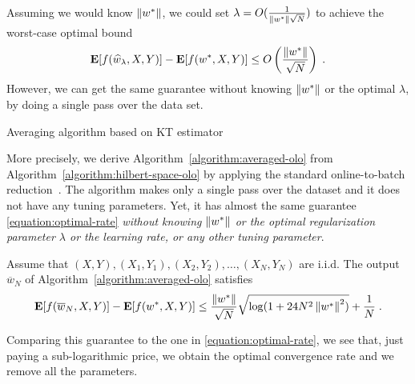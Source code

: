 Assuming we would know $\left\|{w^*}\right\|$, we could set $\lambda =
O(\tfrac{1}{\left\|{w^*}\right\| \sqrt{N}})$ to achieve the worst-case optimal bound
%
\begin{equation}
\label{equation:optimal-rate}
\operatorname*{\mathbf{E}}[f(\widehat{w}_\lambda,X,Y)] - \operatorname*{\mathbf{E}}[f(w^*,X,Y)] \le O\left(\frac{\left\|{w^*}\right\|}{\sqrt{N}}\right) \; .
\end{equation}
However, we can get the same guarantee without knowing $\left\|{w^*}\right\|$ or the
optimal $\lambda$, by doing a single pass over the data set.
%
\begin{algorithm}[t]
\caption{Averaging algorithm based on KT estimator \label{algorithm:averaged-olo}}
\begin{algorithmic}[1]
{
\ENDFOR
{}
}
\end{algorithmic}
\end{algorithm}
%
More precisely, we
derive Algorithm~\ref{algorithm:averaged-olo} from
Algorithm~\ref{algorithm:hilbert-space-olo} by applying the standard
online-to-batch reduction~\citep{Shalev-Shwartz-2011}.  The algorithm makes
only a single pass over the dataset and it does not have any tuning parameters.
Yet, it has almost the same guarantee \eqref{equation:optimal-rate}
\emph{without knowing $\left\|{w^*}\right\|$ or the optimal regularization parameter
$\lambda$ or the learning rate, or any other tuning parameter}.

\begin{theorem}
Assume that $(X, Y), (X_1, Y_1), (X_2, Y_2), \dots, (X_N,Y_N)$ are i.i.d.  The
output $\overline{w}_N$ of Algorithm~\ref{algorithm:averaged-olo} satisfies
$$
\operatorname*{\mathbf{E}}[f(\overline{w}_N,X,Y)] - \operatorname*{\mathbf{E}}[f(w^*,X,Y)] \le \frac{\left\|{w^*}\right\|}{\sqrt{N}} \sqrt{\log(1+24 N^2 \left\|{w^*}\right\|^2)} + \frac{1}{N} \; .
$$
\end{theorem}
%
Comparing this guarantee to the one in \eqref{equation:optimal-rate}, we see
that, just paying a sub-logarithmic price, we obtain the optimal convergence
rate and we remove all the parameters.
